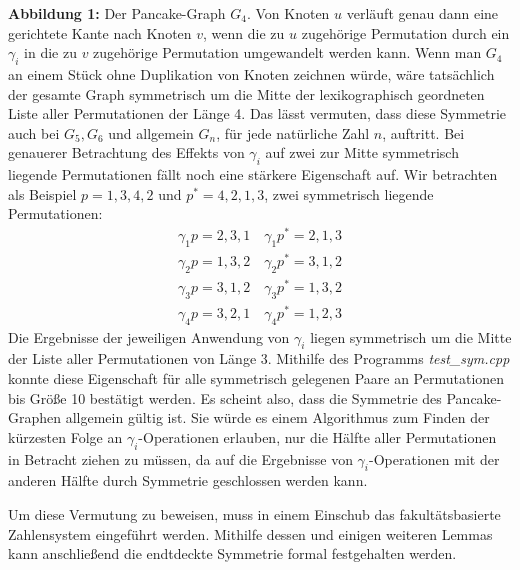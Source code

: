 \documentclass[a4paper, 11pt, ngerman]{article}
\begin{document}
\newline \newline
\textbf{Abbildung 1:} Der Pancake-Graph $G_4$. Von Knoten $u$ verläuft genau dann eine gerichtete Kante nach Knoten $v$, wenn die zu $u$ zugehörige Permutation durch ein $\gamma_i$ in die zu $v$ zugehörige Permutation umgewandelt werden kann.
\newpage
Wenn man $G_4$ an einem Stück ohne Duplikation von Knoten zeichnen würde, wäre tatsächlich der gesamte Graph symmetrisch um die Mitte der lexikographisch geordneten Liste aller Permutationen der Länge 4. Das lässt vermuten, dass diese Symmetrie auch bei $G_5, G_6$ und allgemein $G_n$, für jede natürliche Zahl $n$, auftritt.
Bei genauerer Betrachtung des Effekts von $\gamma_i$ auf zwei zur Mitte symmetrisch liegende Permutationen fällt noch eine stärkere Eigenschaft auf. Wir betrachten als Beispiel $p = 1,3,4,2$ und $p^* = 4, 2, 1, 3$, zwei symmetrisch liegende Permutationen:
\begin{align*}
    \gamma_1 p = 2, 3, 1 \quad \gamma_1 p^* = 2, 1, 3 \\
    \gamma_2 p = 1, 3, 2 \quad \gamma_2 p^* = 3, 1, 2 \\
    \gamma_3 p = 3, 1, 2 \quad \gamma_3 p^* = 1, 3, 2 \\
    \gamma_4 p = 3, 2, 1 \quad \gamma_4 p^* = 1, 2, 3
\end{align*}
Die Ergebnisse der jeweiligen Anwendung von $\gamma_i$ liegen symmetrisch um die Mitte der Liste aller Permutationen von Länge 3. Mithilfe des Programms \emph{test\_sym.cpp} konnte diese Eigenschaft für alle symmetrisch gelegenen Paare an Permutationen bis Größe 10 bestätigt werden. Es scheint also, dass die Symmetrie des Pancake-Graphen allgemein gültig ist. Sie würde es einem Algorithmus zum Finden der kürzesten Folge an $\gamma_i$-Operationen erlauben, nur die Hälfte aller Permutationen in Betracht ziehen zu müssen, da auf die Ergebnisse von $\gamma_i$-Operationen mit der anderen Hälfte durch Symmetrie geschlossen werden kann.

Um diese Vermutung zu beweisen, muss in einem Einschub das fakultätsbasierte Zahlensystem eingeführt werden. Mithilfe dessen und einigen weiteren Lemmas kann anschließend die endtdeckte Symmetrie formal festgehalten werden.
\end{document}
